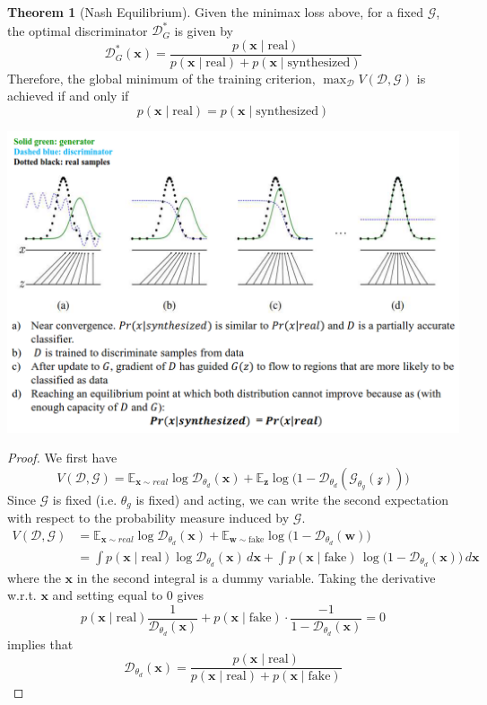\documentclass{article}
\theoremstyle{definition}
\newtheorem{theorem}{Theorem}[section]
\theoremstyle{remark}
\theoremstyle{definition}
\begin{document}
  \begin{theorem}[Nash Equilibrium] 
  Given the minimax loss above, for a fixed $\mathcal{G}$, the optimal discriminator $\mathcal{D}_G^\ast$ is given by 
  \[\mathcal{D}_G^\ast (\mathbf{x}) = \frac{p(\mathbf{x} \mid \text{real})}{p(\mathbf{x} \mid \text{real}) + p(\mathbf{x} \mid \text{synthesized})}\]
  Therefore, the global minimum of the training criterion, $\max_{\mathcal{D}} V(\mathcal{D}, \mathcal{G})$ is achieved if and only if 
  \[p(\mathbf{x} \mid \text{real}) = p(\mathbf{x} \mid \text{synthesized})\]
  \begin{center}
      \includegraphics[scale=0.4]{img/nash_equilibrium.png}
  \end{center}
  \end{theorem}
  \begin{proof} 
  We first have 
  \[V(\mathcal{D}, \mathcal{G}) = \mathbb{E}_{\mathbf{x} \sim real} \log \mathcal{D}_{\theta_d} (\mathbf{x}) + \mathbb{E}_{\mathbf{z}} \log \big( 1 - \mathcal{D}_{\theta_d} (\mathcal{G}_{\theta_g} (\mathcal{z}))\big) \]
  Since $\mathcal{G}$ is fixed (i.e. $\theta_g$ is fixed) and acting, we can write the second expectation with respect to the probability measure induced by $\mathcal{G}$.
  \begin{align*} 
  V(\mathcal{D}, \mathcal{G}) & = \mathbb{E}_{\mathbf{x} \sim real} \log \mathcal{D}_{\theta_d} (\mathbf{x}) + \mathbb{E}_{\mathbf{w} \sim \text{fake}} \log \big( 1 - \mathcal{D}_{\theta_d} (\mathbf{w}) \big) \\   
                                  & = \int p(\mathbf{x} \mid \text{real}) \log \mathcal{D}_{\theta_d}(\mathbf{x}) \,d\mathbf{x}+ \int p(\mathbf{x} \mid \text{fake}) \, \log \big( 1 - \mathcal{D}_{\theta_d} (\mathbf{x}) \big) \,d\mathbf{x} 
  \end{align*}
  where the $\mathbf{x}$ in the second integral is a dummy variable. Taking the derivative w.r.t. $\mathbf{x}$ and setting equal to $0$ gives 
  \[p(\mathbf{x} \mid \text{real}) \frac{1}{\mathcal{D}_{\theta_d} (\mathbf{x})} + p(\mathbf{x} \mid \text{fake}) \cdot \frac{-1}{1 - \mathcal{D}_{\theta_d}(\mathbf{x})} = 0\]
  implies that 
  \[\mathcal{D}_{\theta_d}( \mathbf{x}) = \frac{p(\mathbf{x} \mid \text{real})}{p(\mathbf{x} \mid \text{real}) + p(\mathbf{x} \mid \text{fake})}\]
  \end{proof} 
\end{document}
